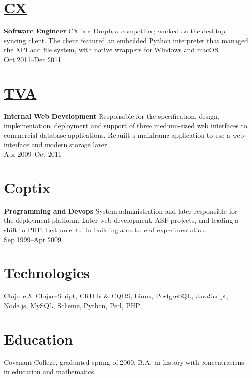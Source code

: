 \documentclass[margin]{res}
\begin{document}
\begin{resume}
\section{\href{https://www.cx.com/}{CX}}
{\bf Software Engineer}
%
CX is a Dropbox competitor; worked on the desktop syncing client. The
client featured an embedded Python interpreter that managed the API
and file system, with native wrappers for Windows and macOS.\\
%
Oct 2011--Dec 2011

\section{\href{http://tva.gov/}{TVA}}
{\bf Internal Web Development}
%
Responsible for the specification, design, implementation, deployment
and support of three medium-sized web interfaces to commercial
database applications. Rebuilt a mainframe application to use a web
interface and modern storage layer.\\
%
Apr 2009--Oct 2011

\section{Coptix}
{\bf Programming and Devops}
%
System administration and later responsible for the deployment
platform. Later web development, ASP projects, and leading a shift to
PHP. Instrumental in building a culture of experimentation.\\
%
Sep 1999--Apr 2009

\section{Technologies}

Clojure \& ClojureScript, CRDTs \& CQRS, Linux, PostgreSQL, JavaScript,
Node.js, MySQL, Scheme, Python, Perl, PHP

\section{Education}

Covenant College, graduated spring of 2000. B.A.\ in history with
concentrations in education and mathematics.

\end{resume}
\end{document}
